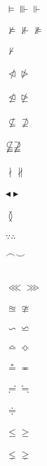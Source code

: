 \documentclass{article}
\begin{document}
$\vDash \Vvdash \Vdash$\\\\
$\nvDash \nVdash \nVDash$\\\\
$\nvdash$\\\\
$\ntriangleleft \ntriangleright$\\\\
$\ntrianglelefteq \ntrianglerighteq$\\\\
$\nsubseteq \nsupseteq$\\\\
$\nsubseteqq \nsupseteqq$\\\\
$\nmid \nparallel$\\\\
$\blacktriangleleft \blacktriangleright$\\\\
$\between$\\\\
$\because \therefore$\\\\
$\smallfrown \smallsmile$\\\\
\\
$\lll \ggg$\\\\
$\approxeq \ncong $\\\\
$\backsim \backsimeq$\\\\
$\bumpeq \Bumpeq $\\\\
$\circeq \eqcirc $\\\\
$\risingdotseq \fallingdotseq $\\\\
$\doteqdot $\\\\
$\leqslant \geqslant $\\\\
$\lneq \gneq $\\\\
\end{document}
